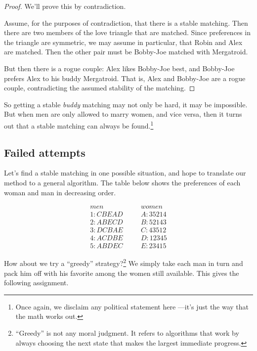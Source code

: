 \begin{proof}
We'll prove this by contradiction.

Assume, for the purposes of contradiction, that there is a stable
matching.  Then there are two members of the love triangle that are
matched.  Since preferences in the triangle are symmetric, we may assume
in particular, that Robin and Alex are matched.  Then the other pair must
be Bobby-Joe matched with Mergatroid.

But then there is a rogue couple: Alex likes Bobby-Joe best, and Bobby-Joe
prefers Alex to his buddy Mergatroid.  That is, Alex and Bobby-Joe are a
rogue couple, contradicting the assumed stability of the matching.
\end{proof}

So getting a stable \emph{buddy} matching may not only be hard, it may
be impossible.  But when men are only allowed to marry women, and
vice versa, then it turns out that a stable matching can always be
found.\footnote{Once again, we disclaim any political statement
  here ---it's just the way that the math works out.}


\iffalse

\subsection{Failed attempts}

Let's find a stable matching in one possible situation, and hope to
translate our method to a general algorithm.  The table below shows the
preferences of each woman and man in decreasing order.

\begin{eqnarray*}
men & \quad & women \\
1 : C B E A D & \quad & A : 3 5 2 1 4 \\
2 : A B E C D & \quad & B : 5 2 1 4 3 \\
3 : D C B A E & \quad & C : 4 3 5 1 2 \\
4 : A C D B E & \quad & D : 1 2 3 4 5 \\
5 : A B D E C & \quad & E : 2 3 4 1 5
\end{eqnarray*}

How about we try a ``greedy'' strategy?\footnote{``Greedy'' is not any
moral judgment.  It refers to algorithms that work by always choosing the
next state that makes the largest immediate progress.}  We simply take
each man in turn and pack him off with his favorite among the women still
available.  This gives the following assignment.

